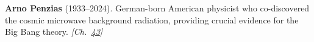 \nobelphysics \textbf{Arno Penzias} (1933–2024). German-born American physicist who co-discovered the cosmic microwave background radiation, providing crucial evidence for the Big Bang theory. \emph{[Ch.~\hyperref[ch:nearflatuniverse]{43}]}

